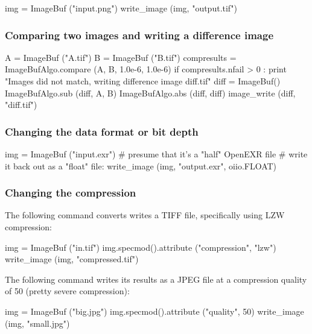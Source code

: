 \begin{code}
    img = ImageBuf ("input.png")
    write_image (img, "output.tif")
\end{code}


\subsubsection*{Comparing two images and writing a difference image}

\begin{code}
    A = ImageBuf ("A.tif")
    B = ImageBuf ("B.tif")
    compresults = ImageBufAlgo.compare (A, B, 1.0e-6, 1.0e-6)
    if compresults.nfail > 0 :
        print "Images did not match, writing difference image diff.tif"
        diff = ImageBuf()
        ImageBufAlgo.sub (diff, A, B)
        ImageBufAlgo.abs (diff, diff)
        image_write (diff, "diff.tif")
\end{code}


\subsubsection*{Changing the data format or bit depth}

\begin{code}
    img = ImageBuf ("input.exr")
    # presume that it's a "half" OpenEXR file
    # write it back out as a "float" file:
    write_image (img, "output.exr", oiio.FLOAT)
\end{code}


\subsubsection*{Changing the compression}

The following command converts writes a TIFF file, specifically using
LZW compression:

\begin{code}
    img = ImageBuf ("in.tif")
    img.specmod().attribute ("compression", "lzw")
    write_image (img, "compressed.tif")
\end{code}

The following command writes its results as a JPEG file at a 
compression quality of 50 (pretty severe compression):

\begin{code}
    img = ImageBuf ("big.jpg")
    img.specmod().attribute ("quality", 50)
    write_image (img, "small.jpg")
\end{code}


